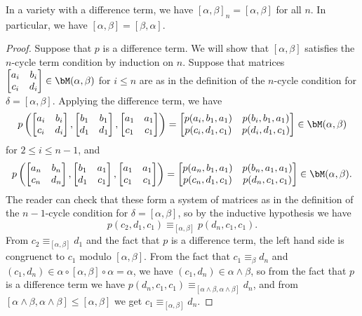 \begin{thm} In a variety with a difference term, we have $[\alpha,\beta]_n = [\alpha,\beta]$ for all $n$. In particular, we have $[\alpha,\beta] = [\beta,\alpha]$.
\end{thm}
\begin{proof} Suppose that $p$ is a difference term. We will show that $[\alpha,\beta]$ satisfies the $n$-cycle term condition by induction on $n$. Suppose that matrices $\begin{bmatrix} a_i & b_i\\ c_i & d_i\end{bmatrix} \in \bM(\alpha,\beta)$ for $i \le n$ are as in the definition of the $n$-cycle condition for $\delta = [\alpha,\beta]$. Applying the difference term, we have
\[
p\left(\begin{bmatrix} a_i & b_i\\ c_i & d_i\end{bmatrix}, \begin{bmatrix} b_1 & b_1\\ d_1 & d_1\end{bmatrix}, \begin{bmatrix} a_1 & a_1\\ c_1 & c_1\end{bmatrix}\right) = \begin{bmatrix} p(a_i,b_1,a_1) & p(b_i, b_1, a_1)\\ p(c_i, d_1, c_1) & p(d_i, d_1, c_1)\end{bmatrix} \in \bM(\alpha,\beta)
\]
for $2 \le i \le n-1$, and
\[
p\left(\begin{bmatrix} a_n & b_n\\ c_n & d_n\end{bmatrix}, \begin{bmatrix} b_1 & a_1\\ d_1 & c_1\end{bmatrix}, \begin{bmatrix} a_1 & a_1\\ c_1 & c_1\end{bmatrix}\right) = \begin{bmatrix} p(a_n,b_1,a_1) & p(b_n, a_1, a_1)\\ p(c_n, d_1, c_1) & p(d_n, c_1, c_1)\end{bmatrix} \in \bM(\alpha,\beta).
\]
The reader can check that these form a system of matrices as in the definition of the $n-1$-cycle condition for $\delta = [\alpha,\beta]$, so by the inductive hypothesis we have
\[
p(c_2,d_1,c_1) \equiv_{[\alpha,\beta]} p(d_n,c_1,c_1).
\]
From $c_2 \equiv_{[\alpha,\beta]} d_1$ and the fact that $p$ is a difference term, the left hand side is congruenct to $c_1$ modulo $[\alpha,\beta]$. From the fact that $c_1 \equiv_{\beta} d_n$ and $(c_1,d_n) \in \alpha \circ [\alpha,\beta] \circ \alpha = \alpha$, we have $(c_1,d_n) \in \alpha \wedge \beta$, so from the fact that $p$ is a difference term we have $p(d_n,c_1,c_1) \equiv_{[\alpha\wedge\beta,\alpha\wedge\beta]} d_n$, and from $[\alpha\wedge\beta,\alpha\wedge\beta] \le [\alpha,\beta]$ we get $c_1 \equiv_{[\alpha,\beta]} d_n$.
\end{proof}

